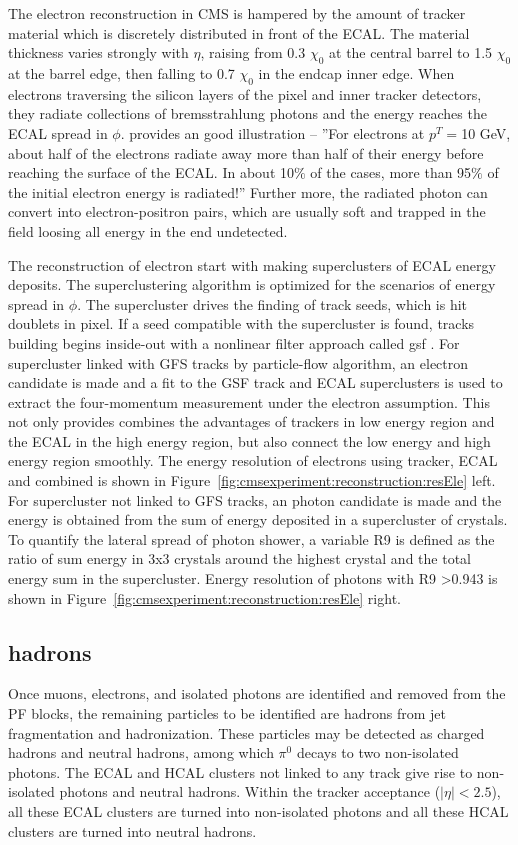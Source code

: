 The electron reconstruction in CMS is hampered by the amount of tracker material which is discretely distributed in front of the ECAL. The material thickness varies strongly with $\eta$, raising from 0.3 $\chi_0$ at the central barrel to 1.5 $\chi_0$ at the barrel edge, then falling to 0.7 $\chi_0$ in the endcap inner edge. When electrons traversing the silicon layers of the pixel and inner tracker detectors, they radiate collections of bremsstrahlung photons and the energy reaches the ECAL spread in $\phi$. \cite{cms:tdr1:Bayatian:2006nff} provides an good illustration -- ''For electrons at $p^T=$10 GeV, about half of the electrons radiate away more than half of their energy before reaching the surface of the ECAL. In about 10$\%$ of the cases, more than 95$\%$ of the initial electron energy is radiated!'' Further more, the radiated photon can convert into electron-positron pairs, which are usually soft and trapped in the field loosing all energy in the end undetected.

The reconstruction of electron start with making superclusters of ECAL energy deposits. The superclustering algorithm is optimized for the scenarios of energy spread in $\phi$. The supercluster drives the finding of track seeds, which is hit doublets in pixel. If a seed compatible with the supercluster is found, tracks building begins inside-out with a nonlinear filter approach called \acrfull{gsf} \cite{tech:gsf:Adam:2005bya}. For supercluster linked with GFS tracks by particle-flow algorithm, an electron candidate is made and a fit to the GSF track and ECAL superclusters is used to extract the four-momentum measurement under the electron assumption. This not only provides combines the advantages of trackers in low energy region and the ECAL in the high energy region, but also connect the low energy and high energy region smoothly. The energy resolution of electrons using tracker, ECAL and combined is shown in Figure~\ref{fig:cmsexperiment:reconstruction:resEle} left. For supercluster not linked to GFS tracks, an photon candidate is made and the energy is obtained from the sum of energy deposited in a supercluster of crystals. To quantify the lateral spread of photon shower, a variable R9 is defined as the ratio of sum energy in 3x3 crystals around the highest crystal and the total energy sum in the supercluster. Energy resolution of photons with R9 >0.943 is shown in Figure~\ref{fig:cmsexperiment:reconstruction:resEle} right.



\subsection{hadrons}
Once muons, electrons, and isolated photons are identified and removed from the PF blocks, the remaining particles to be identified are hadrons from jet fragmentation and hadronization. These particles may be detected as charged hadrons and neutral hadrons, among which $\pi^0$ decays to two non-isolated photons. The ECAL and HCAL clusters not linked to any track give rise to non-isolated photons and neutral hadrons. Within the tracker acceptance ($|\eta|< 2.5$), all these ECAL clusters are turned into non-isolated photons and all these HCAL clusters are turned into neutral hadrons. 

